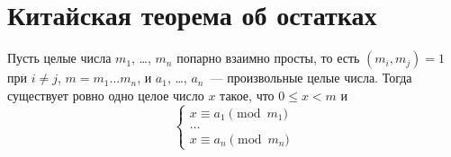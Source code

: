 

\section*{Китайская теорема об остатках}


Пусть целые числа $m_1$, \ldots, $m_n$ попарно взаимно просты, то есть
$(m_i, m_j) = 1$ при $i \neq j$, $m = m_1 \ldots m_n$, и
$a_1$, \ldots, $a_n$~--- произвольные целые числа.
Тогда существует ровно одно целое число $x$ такое, что $0 \leq x < m$ и
\[
    \left\{ \begin{array}{l}
    x \equiv a_1 \pmod{m_1}
\\ \ldots \\
    x \equiv a_n \pmod{m_n}
    \end{array} \right.
\]


